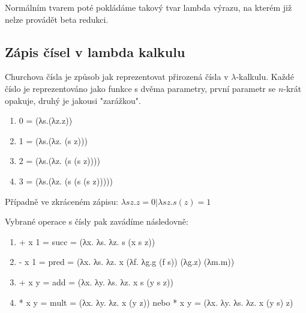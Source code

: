 \documentclass{szzclass}
\begin{document}
Normálním tvarem poté pokládáme takový tvar lambda výrazu, na kterém již nelze provádět beta redukci.

\subsection{Zápis čísel v lambda kalkulu}

Churchova čísla je způsob jak reprezentovat přirozená čísla v $\lambda$-kalkulu. Každé číslo je reprezentováno jako funkce s dvěma parametry, první parametr se  $n$-krát opakuje, druhý je jakousi "zarážkou".

\begin{enumerate}
    \item 0 = (λs.(λz.z))
    \item 1 = (λs.(λz. (s z)))
    \item 2 = (λs.(λz. (s (s z))))
    \item 3 = (λs.(λz. (s (s (s z)))))
\end{enumerate}

Případně ve zkráceném zápisu: $\lambda sz.z = 0 | \lambda sz. s(z) = 1$

Vybrané operace s čísly pak zavádíme následovně:
\begin{enumerate}
    \item + x 1 = succ = (λx. λs. λz. s (x s z))
    \item - x 1 = pred = (λx. λs. λz. x (λf. λg.g (f s)) (λg.z) (λm.m))
    \item + x y = add = (λx. λy. λs. λz. x s (y s z))
    \item * x y = mult = (λx. λy. λz. x (y z)) nebo * x y = (λx. λy. λs. λz. x (y s) z)
\end{enumerate}
\end{document}
